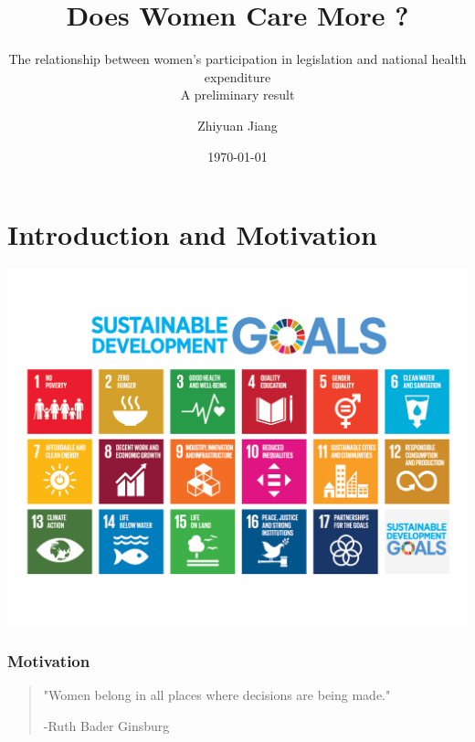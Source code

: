 \documentclass[12pt]{beamer}
\title{Does Women Care More ?}
\subtitle{The relationship between women's participation in legislation and national health expenditure\\A preliminary result }
\date{\today}
\author[author]{Zhiyuan Jiang}
\begin{document}
	
\frame{\titlepage}

\section{Introduction and Motivation}

\begin{frame}[plain]
	\includegraphics[scale = 0.2]{figure/SDG.png}	

\end{frame}

\begin{frame}
	\frametitle{Motivation}\pause
\begin{center}
\begin{quotation}
	"Women belong in all places where decisions are being made."
\begin{flushright}
-Ruth Bader Ginsburg
\end{flushright}
\end{quotation}
\end{center}
\end{frame}

\begin{frame}[plain]
	
\end{frame}
\end{document}
